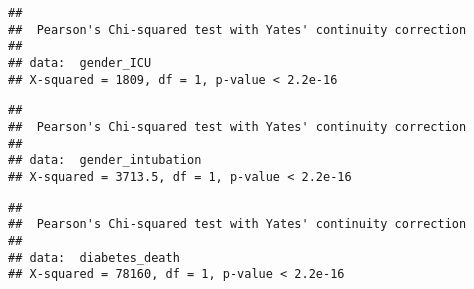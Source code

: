 \documentclass[
]{article}
\newenvironment{Shaded}{\begin{snugshade}}{\end{snugshade}}
\newcommand{\CommentTok}[1]{\textcolor[rgb]{0.56,0.35,0.01}{\textit{#1}}}
\newcommand{\FunctionTok}[1]{\textcolor[rgb]{0.00,0.00,0.00}{#1}}
\newcommand{\NormalTok}[1]{#1}
\newcommand{\OtherTok}[1]{\textcolor[rgb]{0.56,0.35,0.01}{#1}}
\newcommand{\SpecialCharTok}[1]{\textcolor[rgb]{0.00,0.00,0.00}{#1}}
\begin{document}
\begin{Shaded}
\end{Shaded}

\begin{verbatim}
## 
##  Pearson's Chi-squared test with Yates' continuity correction
## 
## data:  gender_ICU
## X-squared = 1809, df = 1, p-value < 2.2e-16
\end{verbatim}

\begin{Shaded}
\end{Shaded}

\begin{verbatim}
## 
##  Pearson's Chi-squared test with Yates' continuity correction
## 
## data:  gender_intubation
## X-squared = 3713.5, df = 1, p-value < 2.2e-16
\end{verbatim}

\begin{Shaded}
\end{Shaded}

\begin{verbatim}
## 
##  Pearson's Chi-squared test with Yates' continuity correction
## 
## data:  diabetes_death
## X-squared = 78160, df = 1, p-value < 2.2e-16
\end{verbatim}
\end{document}
